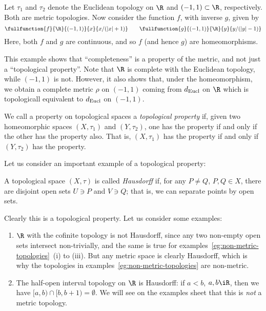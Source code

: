 \begin{example}
	Let $\tau_1$ and $\tau_2$ denote the Euclidean topology on $\R$ and $(-1,1) \subset \R$, respectively. Both are metric topologies. Now consider the function $f$, with inverse $g$, given by
	\begin{equation*}
		\fullfunction{f}{\R}{(-1,1)}{x}{x/(\left\vert x \right\vert+1)}
		\qquad
		\fullfunction{g}{(-1,1)}{\R}{y}{y/(\left\vert y \right\vert-1)}
	\end{equation*}
	Here, both $f$ and $g$ are continuous, and so $f$ (and hence $g$) are homeomorphisms.

	This example shows that ``completeness'' is a property of the metric, and not just a ``topological property''. Note that $\R$ is complete with the Euclidean topology, while $(-1,1)$ is not. However, it also shows that, under the homeomorphism, we obtain a complete metric $\rho$ on $(-1,1)$ coming from $d_{\text{Eucl}}$ on $\R$ which is topologicall equivalent to $d_{\text{Eucl}}$ on $(-1,1)$.
\end{example}

\begin{definition}
	We call a property on topological spaces a \emph{topological property} if, given two homeomorphic spaces $(X,\tau_1)$ and $(Y,\tau_2)$, one has the property if and only if the other has the property also. That is, $(X,\tau_1)$ has the property if and only if $(Y,\tau_2)$ has the property.
\end{definition}

Let us consider an important example of a topological property:

\begin{definition}
	A topological space $(X,\tau)$ is called \emph{Hausdorff} if, for any $P\neq Q$, $P,Q\in X$, there are disjoint open sets $U\ni P$ and $V\ni Q$; that is, we can separate points by open sets.
\end{definition}

Clearly this is a topological property. Let us consider some examples:

\begin{examples}
\mbox{}
\begin{enumerate}
	\shortskip
	\item $\R$ with the cofinite topology is not Hausdorff, since any two non-empty open sets intersect non-trivially, and the same is true for examples~\ref{eg:non-metric-topologies}~(i) to (iii). But any metric space is clearly Hausdorff, which is why the topologies in examples~\ref{eg:non-metric-topologies} are non-metric.
	\item The half-open interval topology on $\R$ is Hausdorff: if $a<b$, $a,b\iR$, then we have $[a,b) \cap [b,b+1) = \emptyset$. We will see on the examples sheet that this is \emph{not} a metric topology.
\end{enumerate}
\end{examples}


